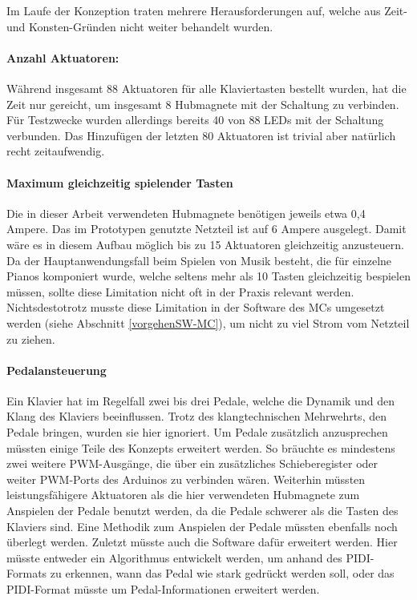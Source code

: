 Im Laufe der Konzeption traten mehrere Herausforderungen auf, welche aus Zeit- und Konsten-Gründen nicht weiter behandelt wurden.

\paragraph{Anzahl Aktuatoren:}
Während insgesamt 88 Aktuatoren für alle Klaviertasten bestellt wurden, hat die Zeit nur gereicht, um insgesamt 8 Hubmagnete mit der Schaltung zu verbinden.
Für Testzwecke wurden allerdings bereits 40 von 88 LEDs mit der Schaltung verbunden.
Das Hinzufügen der letzten 80 Aktuatoren ist trivial aber natürlich recht zeitaufwendig.

\paragraph{Maximum gleichzeitig spielender Tasten}
Die in dieser Arbeit verwendeten Hubmagnete benötigen jeweils etwa 0,4 Ampere.
Das im Prototypen genutzte Netzteil ist auf 6 Ampere ausgelegt.
Damit wäre es in diesem Aufbau möglich bis zu 15 Aktuatoren gleichzeitig anzusteuern.
Da der Hauptanwendungsfall beim Spielen von Musik besteht, die für einzelne Pianos komponiert wurde, welche seltens mehr als 10 Tasten gleichzeitig bespielen müssen, sollte diese Limitation nicht oft in der Praxis relevant werden.
Nichtsdestotrotz musste diese Limitation in der Software des \ac{MC}s umgesetzt werden (siehe Abschnitt \ref{vorgehenSW-MC}), um nicht zu viel Strom vom Netzteil zu ziehen.

\paragraph{Pedalansteuerung}
Ein Klavier hat im Regelfall zwei bis drei Pedale, welche die Dynamik und den Klang des Klaviers beeinflussen.
Trotz des klangtechnischen Mehrwehrts, den Pedale bringen, wurden sie hier ignoriert.
Um Pedale zusätzlich anzusprechen müssten einige Teile des Konzepts erweitert werden.
So bräuchte es mindestens zwei weitere \ac{PWM}-Ausgänge, die über ein zusätzliches Schieberegister oder weiter \ac{PWM}-Ports des Arduinos zu verbinden wären.
Weiterhin müssten leistungsfähigere Aktuatoren als die hier verwendeten Hubmagnete zum Anspielen der Pedale benutzt werden, da die Pedale schwerer als die Tasten des Klaviers sind.
Eine Methodik zum Anspielen der Pedale müssten ebenfalls noch überlegt werden.
Zuletzt müsste auch die Software dafür erweitert werden.
Hier müsste entweder ein Algorithmus entwickelt werden, um anhand des \ac{PIDI}-Formats zu erkennen, wann das Pedal wie stark gedrückt werden soll, oder das \ac{PIDI}-Format müsste um Pedal-Informationen erweitert werden.

